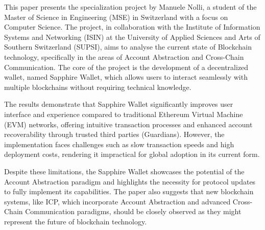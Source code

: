 \label{chap:abstract}

This paper presents the specialization project by Manuele Nolli, a student of the Master of Science in Engineering (MSE) in Switzerland with a focus on Computer Science. The project, in collaboration with the Institute of Information Systems and Networking (ISIN) at the University of Applied Sciences and Arts of Southern Switzerland (SUPSI), aims to analyse the current state of Blockchain technology, specifically in the areas of Account Abstraction and Cross-Chain Communication. The core of the project is the development of a decentralized wallet, named Sapphire Wallet, which allows users to interact seamlessly with multiple blockchains without requiring technical knowledge.

The results demonstrate that Sapphire Wallet significantly improves user interface and experience compared to traditional Ethereum Virtual Machine (EVM) networks, offering intuitive transaction processes and enhanced account recoverability through trusted third parties (Guardians). However, the implementation faces challenges such as slow transaction speeds and high deployment costs, rendering it impractical for global adoption in its current form.

Despite these limitations, the Sapphire Wallet showcases the potential of the Account Abstraction paradigm and highlights the necessity for protocol updates to fully implement its capabilities. The paper also suggests that new blockchain systems, like ICP, which incorporate Account Abstraction and advanced Cross-Chain Communication paradigms, should be closely observed as they might represent the future of blockchain technology.


